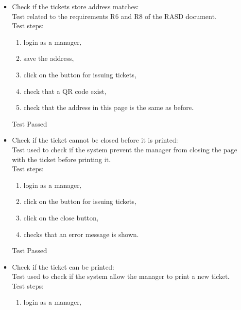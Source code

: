 \begin{itemize}
    \item Check if the tickets store address matches: \\
    Test related to the requirements R6 and R8 of the RASD document. \\
    Test steps: \\
    \begin{enumerate}

        \item login as a manager,

        \item save the address,

        \item click on the button for issuing tickets,

        \item check that a QR code exist,

        \item check that the address in this page is the same as before.
    \end{enumerate}
    Test Passed

    \item Check if the ticket cannot be closed before it is printed: \\
    Test used to check if the system prevent the manager from closing the page with the ticket before printing it. \\
    Test steps: \\
    \begin{enumerate}
        \item login as a manager,

        \item click on the button for issuing tickets,

        \item click on the close button,

        \item checks that an error message is shown.
    \end{enumerate}
    Test Passed \\

    \item Check if the ticket can be printed: \\
    Test used to check if the system allow the manager to print a new ticket. \\
    Test steps:\\
    \begin{enumerate}
        \item login as a manager,


\end{enumerate}
\end{itemize}
